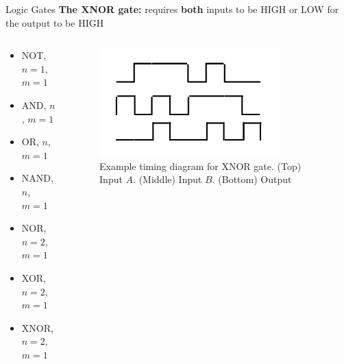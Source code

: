 \documentclass{beamer}
\begin{document}
\begin{frame}{Logic Gates}
\textbf{The XNOR gate:} requires \textbf{both} inputs to be HIGH or LOW for the output to be HIGH \\ \vspace{0.5cm}
\begin{columns}[T]
\begin{column}{0.5\textwidth}
\begin{itemize}
\item \alert{NOT, $n=1$, $m=1$}
\item \alert{AND, $n$, $m=1$}
\item \alert{OR, $n$, $m=1$}
\item \alert{NAND, $n$, $m=1$}
\item \alert{NOR, $n=2$, $m=1$}
\item \alert{XOR, $n=2$, $m=1$}
\item \alert{XNOR, $n=2$, $m=1$}
\end{itemize}
\end{column}
\begin{column}{0.5\textwidth}
\begin{figure}
\centering
\includegraphics[width=0.8\textwidth]{figures/TimingXnor.pdf}
\caption{\label{fig:xnor2} Example timing diagram for XNOR gate.  (Top) Input $A$.  (Middle) Input $B$. (Bottom) Output}
\end{figure}
\end{column}
\end{columns}
\end{frame}
\end{document}
